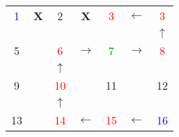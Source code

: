 \documentclass[12pt]
{report}
\begin{document}
\begin{center}
\begin{tabular}{|ccccccc|}
\hline
\textcolor{blue}{1} &\textbf{X} & 2 &\textbf{X} & \textcolor{red}{3} &$\leftarrow$ & \textcolor{red}{3} \\
&&&&&&$\uparrow$ \\
5 & & \textcolor{red}{6} &$\rightarrow$& \textcolor{green}{7} & $\rightarrow$ & \textcolor{red}{8} \\
&&$\uparrow$&&&& \\
9 & & \textcolor{red}{10} & & 11 &  & 12 \\
&&$\uparrow$&&&& \\
13 & & \textcolor{red}{14} &$\leftarrow$& \textcolor{red}{15} &$\leftarrow$& \textcolor{blue}{16} \\
\hline
\end{tabular}
\end{center}
\end{document}
